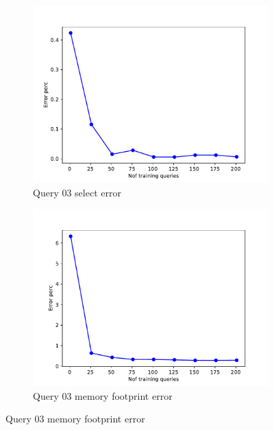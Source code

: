 \begin{figure}[!htb]
   \begin{subfigure}[t]{0.5\textwidth}
     \includegraphics[scale=0.4]{figs/tpch10/tpch10_sel03_error.pdf}
     \caption{Query 03 select error}
     \label{fig:tpch_sel03}
   \end{subfigure}
   \begin{subfigure}[t]{0.5\textwidth}
     \includegraphics[scale=0.4]{figs/tpch10/tpch10_q03_memerror.pdf}
     \caption{Query 03 memory footprint error}
     \label{fig:tpch_mem03}
   \end{subfigure}




\end{figure}
